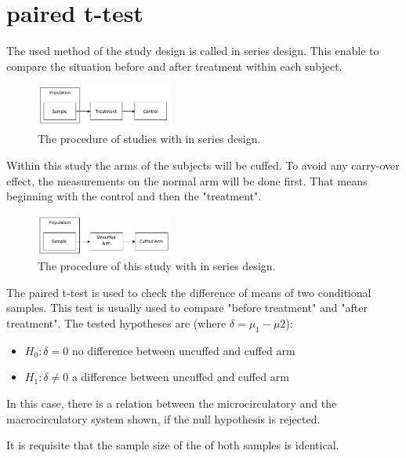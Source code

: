 \chapter{paired t-test}

The used method of the study design is called in series design. This enable to compare the situation before and after treatment within each subject.
\begin{figure}[H]
	\includegraphics[width=0.4\textwidth]{figures/inseries1}
	\caption{The procedure of studies with in series design.}
	\label{fig:FigureLABEL}
\end{figure}

Within this study the arms of the subjects will be cuffed. To avoid any carry-over effect, the measurements on the normal arm will be done first. That means beginning with the control and then the "treatment".
\begin{figure}[H]
	\includegraphics[width=0.4\textwidth]{figures/inseries2}
	\caption{The procedure of this study with in series design.}
	\label{fig:FigureLABEL}
\end{figure}

The paired t-test is used to check the difference of means of two conditional samples. This test is usually used to compare "before treatment" and "after treatment".
The tested hypotheses are (where $\delta=\mu_{1}-\mu{2}$)\cite{dodge2008}:
\begin{itemize}
	\item $ H_{0}: \delta=0 $
	no difference between uncuffed and cuffed arm
	\item $ H_{1}: \delta\neq0 $
	a difference between uncuffed and cuffed arm
\end{itemize}
In this case, there is a relation between the microcirculatory and the macrocirculatory system shown, if the null hypothesis is rejected.

It is requisite that the sample size of the of both samples is identical.

